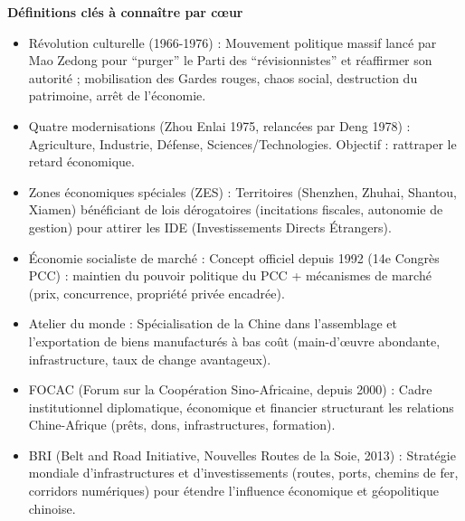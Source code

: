 \documentclass[11pt]{article}
\newcommand{\cle}[1]{{\popxbold\color{popdark}#1}}
\begin{document}
\begin{bilan}
\textbf{D\'efinitions cl\'es \`a conna\^itre par c\oe{}ur}
\begin{itemize}
  \item \cle{R\'evolution culturelle (1966-1976)} : Mouvement politique massif lanc\'e par Mao Zedong pour ``purger'' le Parti des ``r\'evisionnistes'' et r\'eaffirmer son autorit\'e ; mobilisation des \cle{Gardes rouges}, chaos social, destruction du patrimoine, arr\^et de l'\'economie.
  \item \cle{Quatre modernisations} (Zhou Enlai 1975, relanc\'ees par Deng 1978) : Agriculture, Industrie, D\'efense, Sciences/Technologies. Objectif : rattraper le retard \'economique.
  \item \cle{Zones \'economiques sp\'eciales (ZES)} : Territoires (Shenzhen, Zhuhai, Shantou, Xiamen) b\'en\'eficiant de lois d\'erogatoires (incitations fiscales, autonomie de gestion) pour attirer les \cle{IDE} (Investissements Directs \'Etrangers).
  \item \cle{\'Economie socialiste de march\'e} : Concept officiel depuis 1992 (14e Congr\`es PCC) : maintien du pouvoir politique du PCC + m\'ecanismes de march\'e (prix, concurrence, propri\'et\'e priv\'ee encadr\'ee).
  \item \cle{Atelier du monde} : Sp\'ecialisation de la Chine dans l'assemblage et l'exportation de biens manufactur\'es \`a bas co\^ut (main-d'\oe{}uvre abondante, infrastructure, taux de change avantageux).
  \item \cle{FOCAC} (Forum sur la Coop\'eration Sino-Africaine, depuis 2000) : Cadre institutionnel diplomatique, \'economique et financier structurant les relations Chine-Afrique (pr\^ets, dons, infrastructures, formation).
  \item \cle{BRI} (Belt and Road Initiative, Nouvelles Routes de la Soie, 2013) : Strat\'egie mondiale d'infrastructures et d'investissements (routes, ports, chemins de fer, corridors num\'eriques) pour \'etendre l'influence \'economique et g\'eopolitique chinoise.
\end{itemize}


\end{bilan}
\end{document}
